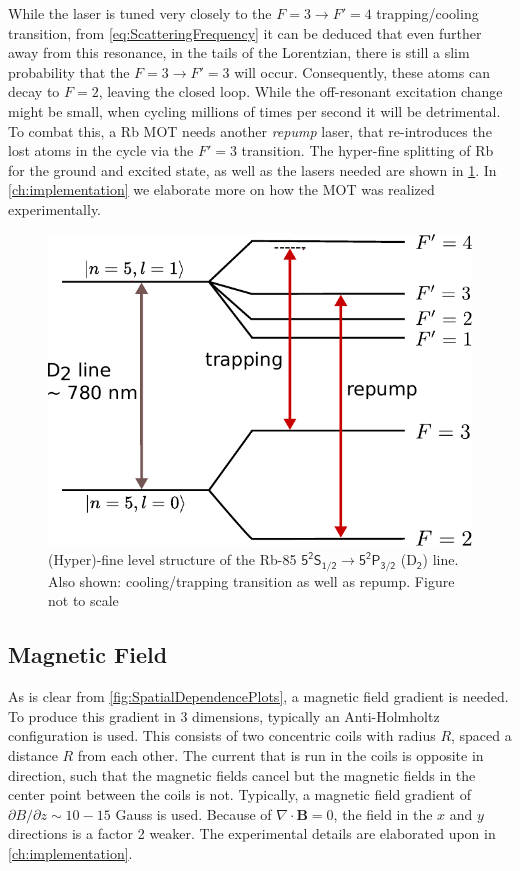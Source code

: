While the laser is tuned very closely to the $F = 3 \rightarrow F'=4$ trapping/cooling transition, from \cref{eq:ScatteringFrequency} it can be deduced that even further away from this resonance, in the tails of the Lorentzian, there is still a slim probability that the $F=3 \rightarrow F'=3$ will occur.
Consequently, these atoms can decay to $F=2$, leaving the closed loop.
While the off-resonant excitation change might be small, when cycling millions of times per second it will be detrimental. 
To combat this, a Rb \ac{MOT} needs another \textit{repump} laser, that re-introduces the lost atoms in the cycle via the $F'=3$ transition.
The hyper-fine splitting of Rb for the ground and excited state, as well as the lasers needed are shown in \cref{fig:D2line}.
In \cref{ch:implementation} we elaborate more on how the MOT was realized experimentally. 

\begin{figure}
    \centering
    \includegraphics[width=0.48\linewidth]{figures/D2line.pdf}
    \caption{(Hyper)-fine level structure of the Rb-85 $\mathsf{5^{2}S_{1/2} \rightarrow 5 ^2P_{3/2}}$ (D$\mathsf{_2}$) line. Also shown: cooling/trapping transition as well as repump. Figure not to scale}
    \label{fig:D2line}
\end{figure}


\subsection{Magnetic Field}

As is clear from \cref{fig:SpatialDependencePlots}, a magnetic field gradient is needed.
To produce this gradient in 3 dimensions, typically an Anti-Holmholtz configuration is used. 
This consists of two concentric coils with radius $R$, spaced a distance $R$ from each other. 
The current that is run in the coils is opposite in direction, such that the magnetic fields cancel but the magnetic fields in the center point between the coils is not.
Typically, a magnetic field gradient of $\partial B/\partial z \sim 10-15$ Gauss is used.
Because of $\nabla \cdot \mathbf{B}=0$, the field in the $x$ and $y$ directions is a factor 2 weaker. The experimental details are elaborated upon in \cref{ch:implementation}.

